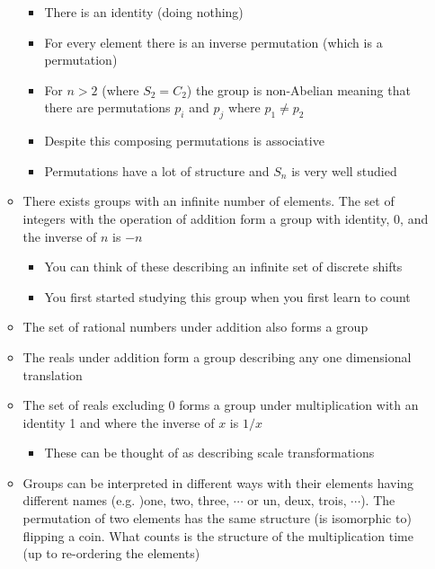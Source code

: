 \documentclass[11pt]{article}
\begin{document}
\begin{itemize}
\begin{itemize}
\begin{itemize}
\item There is an identity (doing nothing)
\item For every element there is an inverse permutation (which is a permutation)
\item For \(n>2\) (where \(S_{2}=C_{2}\)) the group is non-Abelian meaning that there
are permutations \(p_{i}\) and \(p_{j}\) where \(p_{1}\neq p_{2}\)
\item Despite this composing permutations is associative
\item Permutations have a lot of structure and \(S_{n}\) is very well studied
\end{itemize}
\item There exists groups with an infinite number of elements.  The set of integers with the
operation of addition form a group with identity, 0, and the inverse of \(n\) is \(-n\)
\begin{itemize}
\item You can think of these describing an infinite set of discrete shifts
\item You first started studying this group when you first learn to count
\end{itemize}
\item The set of rational numbers under addition also forms a group
\item The reals under addition form a group describing any one dimensional translation
\item The set of reals excluding 0 forms a group under multiplication with an identity 1 
and where the inverse of \(x\) is \(1/x\)
\begin{itemize}
\item These can be thought of as describing scale transformations
\end{itemize}
\item Groups can be interpreted in different ways with their elements having different names
(e.g. )one, two, three, \(\cdots{}\) or un, deux, trois, \(\cdots{}\)).  The permutation of two elements
has the same structure (is isomorphic to) flipping a coin.  What counts is the structure of
the multiplication time (up to re-ordering the elements)
\end{itemize}
\end{itemize}
\end{document}
